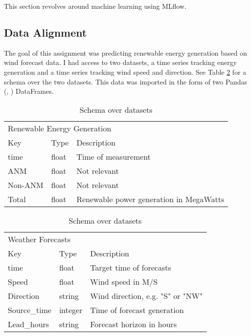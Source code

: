 This section revolves around machine learning using MLflow.

\subsection{Data Alignment}

The goal of this assignment was predicting renewable energy generation based on wind forecast data. I had access to two datasets, a time series tracking energy generation and a time series tracking wind speed and direction. See Table \ref{table:data} for a schema over the two datasets. This data was imported in the form of two Pandas (\cite{reback2020pandas}, \cite{mckinney-proc-scipy-2010}) DataFrames. 

\begin{table}[]
    \centering
    \begin{tabular}{lll}
    \hline
    \multicolumn{3}{l}{Renewable Energy Generation}           \\
Key     & Type  & Description                             \\ \hline
time    & float & Time of measurement                     \\
ANM     & float & Not relevant                            \\
Non-ANM & float & Not relevant                            \\
Total   & float & Renewable power generation in MegaWatts \\ \hline
    \end{tabular}
    \begin{tabular}{lll}
    \multicolumn{3}{l}{Weather Forecasts}           \\
Key     & Type  & Description                             \\ \hline
time    & float & Target time of forecasts                     \\
Speed     & float & Wind speed in M/S                            \\
Direction & string & Wind direction, e.g. "S" or "NW"                            \\
Source\_time   & integer & Time of forecast generation \\ \hline
Lead\_hours   & string & Forecast horizon in hours \\ \hline
    \end{tabular}
    \caption{Schema over datasets}
    \label{table:data}
\end{table}

